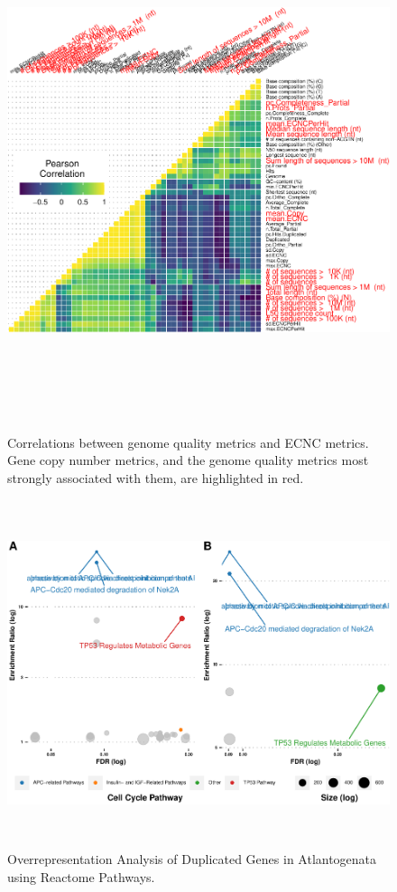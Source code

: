 \documentclass[]{elsarticle} %
\begin{document}
\begin{figure}

{\centering \includegraphics[width=6in,height=6in]{paper_PLOS_draft_files/figure-latex/Figure-GenomeCor-1} 

}

\caption{Correlations between genome quality metrics and ECNC metrics. Gene copy number metrics, and the genome quality metrics most strongly associated with them, are highlighted in red.}\label{fig:Figure-GenomeCor}
\end{figure}

\begin{figure}

\includegraphics[width=6in,height=4in]{paper_PLOS_draft_files/figure-latex/Figure-loxAfrORA-1} \hfill{}

\caption{Overrepresentation Analysis of Duplicated Genes in Atlantogenata using Reactome Pathways.}\label{fig:Figure-loxAfrORA}
\end{figure}
\end{document}
